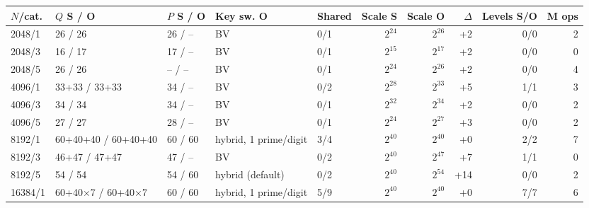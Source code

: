 \begin{longtable}{@{}lllllrrrrr@{}}
\toprule
$N$/cat. & $Q$ S / O & $P$ S / O & Key sw. O & Shared & Scale S & Scale O & $\Delta$ & Levels S/O & M ops \\
\midrule
\endhead
2048/1 & 26 / 26 & 26 / -- & BV & 0/1 & $2^{24}$ & $2^{26}$ & +2 & 0/0 & 2 \\
2048/3 & 16 / 17 & 17 / -- & BV & 0/1 & $2^{15}$ & $2^{17}$ & +2 & 0/0 & 0 \\
2048/5 & 26 / 26 & -- / -- & BV & 0/1 & $2^{24}$ & $2^{26}$ & +2 & 0/0 & 4 \\
4096/1 & 33+33 / 33+33 & 34 / -- & BV & 0/2 & $2^{28}$ & $2^{33}$ & +5 & 1/1 & 3 \\
4096/3 & 34 / 34 & 34 / -- & BV & 0/1 & $2^{32}$ & $2^{34}$ & +2 & 0/0 & 2 \\
4096/5 & 27 / 27 & 28 / -- & BV & 0/1 & $2^{24}$ & $2^{27}$ & +3 & 0/0 & 2 \\
8192/1 & 60+40+40 / 60+40+40 & 60 / 60 & hybrid, 1 prime/digit & 3/4 & $2^{40}$ & $2^{40}$ & +0 & 2/2 & 7 \\
8192/3 & 46+47 / 47+47 & 47 / -- & BV & 0/2 & $2^{40}$ & $2^{47}$ & +7 & 1/1 & 0 \\
8192/5 & 54 / 54 & 54 / 60 & hybrid (default) & 0/2 & $2^{40}$ & $2^{54}$ & +14 & 0/0 & 2 \\
16384/1 & 60+40$\times$7 / 60+40$\times$7 & 60 / 60 & hybrid, 1 prime/digit & 5/9 & $2^{40}$ & $2^{40}$ & +0 & 7/7 & 6 \\
\bottomrule
\end{longtable}
